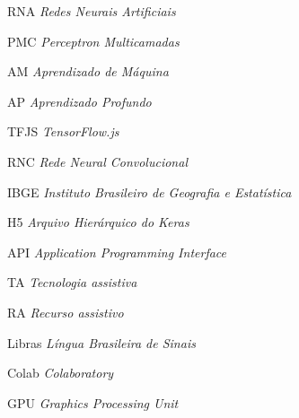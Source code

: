 \begin{siglas}
	\item[RNA] \emph{Redes Neurais Artificiais}
	\item[PMC] \emph{Perceptron Multicamadas}
	\item[AM] \emph{Aprendizado de Máquina}
	\item[AP] \emph{Aprendizado Profundo}
	\item[TFJS] \emph{TensorFlow.js}
	\item[RNC] \emph{Rede Neural Convolucional}
	\item[IBGE] \emph{Instituto Brasileiro de Geografia e Estatística}
	\item[H5] \emph{Arquivo Hierárquico do Keras}
	\item[API] \emph{Application Programming Interface}
	\item[TA] \emph{Tecnologia assistiva}
	\item[RA] \emph{Recurso assistivo}
	\item[Libras] \emph{Língua Brasileira de Sinais}
	\item[Colab] \emph{Colaboratory}
	\item[GPU] \emph{Graphics Processing Unit}
\end{siglas}
